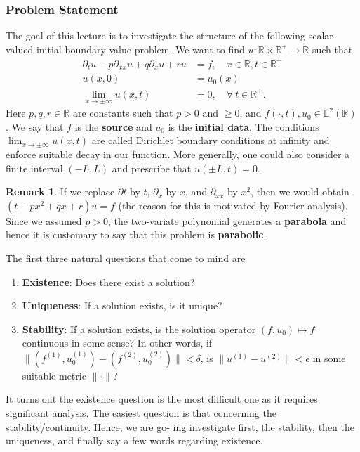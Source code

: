 \documentclass{article}
\theoremstyle{definition}
\theoremstyle{definition}
\newtheorem{remark}[theorem]{Remark}
\newcommand{\R}{\mathbb{R}}
\begin{document}
\subsubsection{Problem Statement}
The goal of this lecture is to investigate the structure of the following scalar-valued initial boundary value problem. We want to find $u:\R\times \R^+\to \R$ such that
\begin{align*}
    \partial_{t}u-p\partial_{xx}u+q\partial_{x}u+ru&=f,\quad x\in \R,t\in \R^+ \\
    u(x,0)&=u_0(x) \\
    \lim_{x\to \pm \infty}u(x,t)&=0, \quad \forall\:t\in \R^+.
\end{align*}
Here $p,q,r\in \R$ are constants such that $p>0$ and $\geq 0$, and $f(\cdot ,t),u_0\in \mathbb{L}^2(\R)$. We say that $f$ is the \textbf{source} and $u_0$ is the \textbf{initial data}. The conditions $\lim_{x\to \pm \infty}u(x,t)$ are called Dirichlet boundary conditions at infinity and enforce suitable decay in our function. More generally, one could also consider a finite interval $(-L,L)$ and prescribe that $u(\pm L,t)=0$.
\begin{remark}
    If we replace $\partial t$ by $t$, $\partial_{x}$ by $x$, and $\partial_{xx}$ by $x^2$, then we would obtain $(t-px^2+qx+r)u=f$ (the reason for this is motivated by Fourier analysis). Since we assumed $p>0$, the two-variate polynomial generates a \textbf{parabola} and hence it is customary to say that this problem is \textbf{parabolic}.
\end{remark}
The first three natural questions that come to mind are
\begin{enumerate}
    \item \textbf{Existence}: Does there exist a solution?
    \item \textbf{Uniqueness}: If a solution exists, is it unique?
    \item \textbf{Stability}: If a solution exists, is the solution operator $(f,u_0)\mapsto f$ continuous in some sense? In other words, if $\|(f^{(1)},u_0^{(1)})-(f^{(2)},u_0^{(2)})\|<\delta$, is $\|u^{(1)}-u^{(2)}\|<\epsilon$ in some suitable metric $\|\cdot\|$?
\end{enumerate}
It turns out the existence question is the most difficult one as it requires significant analysis. The easiest question is that concerning the stability/continuity. Hence, we are go-
ing investigate first, the stability, then the uniqueness, and finally say a few words
regarding existence.
\end{document}
